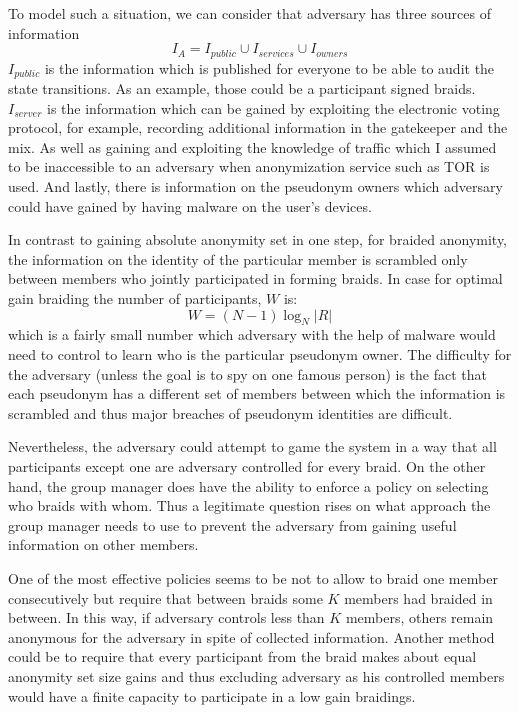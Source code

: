 \documentclass[12pt]{article}
\begin{document}
To model such a situation, we can consider that adversary has three sources of information
\begin{equation}
  I_A = I_{public} \cup I_{services} \cup I_{owners}
\end{equation}
$I_{public}$ is the information which is published for everyone to be able to audit the state transitions. As an example, those could be a participant signed braids. $I_{server}$ is the information which can be gained by exploiting the electronic voting protocol, for example, recording additional information in the gatekeeper and the mix. As well as gaining and exploiting the knowledge of traffic which I assumed to be inaccessible to an adversary when anonymization service such as TOR is used. And lastly, there is information on the pseudonym owners which adversary could have gained by having malware on the user's devices.

In contrast to gaining absolute anonymity set in one step, for braided anonymity, the information on the identity of the particular member is scrambled only between members who jointly participated in forming braids. In case for optimal gain braiding the number of participants, $W$ is:
\begin{equation}
  W = (N -1) \log_N |R|
\end{equation}
which is a fairly small number which adversary with the help of malware would need to control to learn who is the particular pseudonym owner. The difficulty for the adversary (unless the goal is to spy on one famous person) is the fact that each pseudonym has a different set of members between which the information is scrambled and thus major breaches of pseudonym identities are difficult.

Nevertheless, the adversary could attempt to game the system in a way that all participants except one are adversary controlled for every braid. On the other hand, the group manager does have the ability to enforce a policy on selecting who braids with whom. Thus a legitimate question rises on what approach the group manager needs to use to prevent the adversary from gaining useful information on other members.

One of the most effective policies seems to be not to allow to braid one member consecutively but require that between braids some $K$ members had braided in between. In this way, if adversary controls less than $K$ members, others remain anonymous for the adversary in spite of collected information. Another method could be to require that every participant from the braid makes about equal anonymity set size gains and thus excluding adversary as his controlled members would have a finite capacity to participate in a low gain braidings. 
\end{document}
